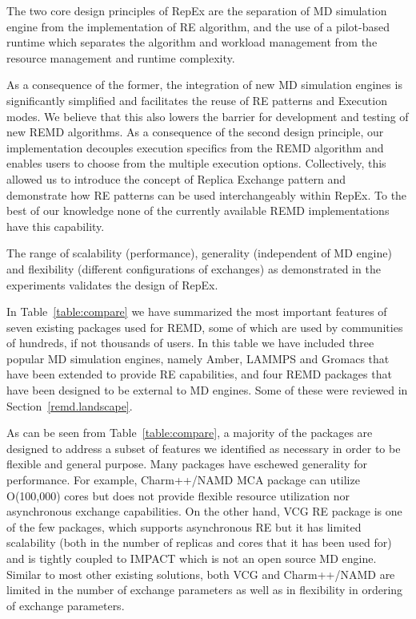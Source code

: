 \documentclass{sig-alternate-05-2015}
\begin{document}
The two core design principles of RepEx are the separation of MD simulation engine from the implementation of RE algorithm, and the use of a pilot-based runtime which separates the algorithm and workload management from the resource management and runtime complexity.

As a consequence of the former, the integration of new MD simulation engines is significantly simplified and facilitates the reuse of RE patterns and Execution modes. We believe that this also lowers the barrier for development and testing of new REMD algorithms.  As a consequence of the second design principle, our implementation decouples execution specifics from the REMD algorithm and enables users to choose from the multiple execution options.  Collectively, this allowed us to introduce the concept of Replica Exchange pattern and demonstrate how RE patterns can be used interchangeably within RepEx. To the best of our knowledge none of the currently available REMD implementations have this capability.

The range of scalability (performance), generality (independent of MD engine) and flexibility (different configurations of exchanges) as demonstrated in the experiments validates the design of RepEx. 

In Table~\ref{table:compare} we have summarized the most important features of seven existing packages used for REMD, some of which are used by communities of hundreds, if not thousands of users. In this table we have included three popular MD simulation engines, namely Amber, LAMMPS and Gromacs that have been extended to provide RE capabilities, and four REMD packages that have been designed to be external to MD engines. Some of these were reviewed in Section~\ref{remd.landscape}.

As can be seen from Table~\ref{table:compare}, a majority of the packages are designed to address a subset of features we identified as necessary in order to be flexible and general purpose. Many packages have eschewed generality for performance. For example, Charm++/NAMD MCA package can utilize O(100,000) cores but does not provide flexible resource utilization nor asynchronous exchange capabilities. On the other hand, VCG RE package is one of the few packages, which supports asynchronous RE but it has limited scalability (both in the number of replicas and cores that it has been used for) and is tightly coupled to IMPACT which is not an open source MD engine. Similar to most other existing solutions, both VCG and Charm++/NAMD are limited in the number of exchange parameters as well as in flexibility in ordering of exchange parameters.
\end{document}
